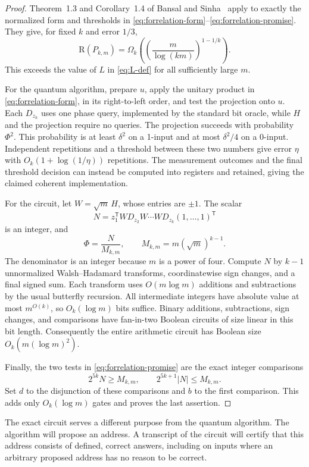 \documentclass[11pt]{article}
\theoremstyle{definition}
\newcommand{\R}{\mathrm R}
\begin{document}
\begin{proof}
Theorem~1.3 and Corollary~1.4 of Bansal and Sinha~\cite{BS21} apply to
exactly the normalized form and thresholds in
\eqref{eq:forrelation-form}--\eqref{eq:forrelation-promise}.  They give,
for fixed $k$ and error $1/3$,
\[
 \R(P_{k,m})=
 \Omega_k\!\left(
   \left(\frac{m}{\log(km)}\right)^{1-1/k}
 \right).
\]
This exceeds the value of $L$ in \eqref{eq:L-def} for all sufficiently
large $m$.

For the quantum algorithm, prepare $u$, apply the unitary product in
\eqref{eq:forrelation-form}, in its right-to-left order, and test the
projection onto $u$.  Each $D_{z_h}$ uses one phase query, implemented by
the standard bit oracle, while $H$ and the projection require no queries.
The projection succeeds with probability $\Phi^2$.  This probability is
at least $\delta^2$ on a 1-input and at most $\delta^2/4$ on a 0-input.
Independent repetitions and a threshold between these two numbers give
error $\eta$ with $O_k(1+\log(1/\eta))$ repetitions.  The measurement
outcomes and the final threshold decision can instead be computed into
registers and retained, giving the claimed coherent implementation.

For the circuit, let $W=\sqrt m\,H$, whose entries are $\pm1$.  The scalar
\[
 N=z_1^{\mathsf T}W D_{z_2}W\cdots W D_{z_k}(1,\ldots,1)^{\mathsf T}
\]
is an integer, and
\[
 \Phi=\frac{N}{M_{k,m}},
 \qquad M_{k,m}=m(\sqrt m)^{k-1}.
\]
The denominator is an integer because $m$ is a power of four.  Compute
$N$ by $k-1$ unnormalized Walsh--Hadamard transforms, coordinatewise sign
changes, and a final signed sum.  Each transform uses $O(m\log m)$
additions and subtractions by the usual butterfly recursion.  All
intermediate integers have absolute value at most $m^{O(k)}$, so
$O_k(\log m)$ bits suffice.  Binary additions, subtractions, sign changes,
and comparisons have fan-in-two Boolean circuits of size linear in this
bit length.  Consequently the entire arithmetic circuit has Boolean size
$O_k(m(\log m)^2)$.

Finally, the two tests in \eqref{eq:forrelation-promise} are the exact
integer comparisons
\[
 2^{5k}N\geq M_{k,m},
 \qquad 2^{5k+1}|N|\leq M_{k,m}.
\]
Set $d$ to the disjunction of these comparisons and $b$ to the first
comparison.  This adds only $O_k(\log m)$ gates and proves the last
assertion.
\end{proof}

The exact circuit serves a different purpose from the quantum algorithm.
The algorithm will propose an address.  A transcript of the circuit will
certify that this address consists of defined, correct answers, including
on inputs where an arbitrary proposed address has no reason to be correct.
\end{document}
